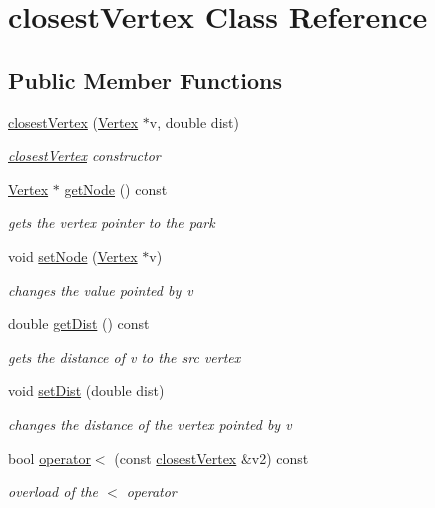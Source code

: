\hypertarget{classclosest_vertex}{}\section{closest\+Vertex Class Reference}
\label{classclosest_vertex}
\subsection*{Public Member Functions}
\begin{DoxyCompactItemize}
\item 
\hyperlink{classclosest_vertex_acd41491eb99e59a0f10ee8de0b50a66d}{closest\+Vertex} (\hyperlink{class_vertex}{Vertex} $\ast$v, double dist)
\begin{DoxyCompactList}\small\item\em \hyperlink{classclosest_vertex}{closest\+Vertex} constructor \end{DoxyCompactList}\item 
\hyperlink{class_vertex}{Vertex} $\ast$ \hyperlink{classclosest_vertex_ac5f6fae3c1b289755622166f2ef700c0}{get\+Node} () const
\begin{DoxyCompactList}\small\item\em gets the vertex pointer to the park \end{DoxyCompactList}\item 
void \hyperlink{classclosest_vertex_a899b2479d95304851a4749e008b21065}{set\+Node} (\hyperlink{class_vertex}{Vertex} $\ast$v)
\begin{DoxyCompactList}\small\item\em changes the value pointed by v \end{DoxyCompactList}\item 
double \hyperlink{classclosest_vertex_a2b8387796aa6b9dedaac682ee11ecc30}{get\+Dist} () const
\begin{DoxyCompactList}\small\item\em gets the distance of v to the src vertex \end{DoxyCompactList}\item 
void \hyperlink{classclosest_vertex_a16d20ede3c6e2be693305fac4e0ccdea}{set\+Dist} (double dist)
\begin{DoxyCompactList}\small\item\em changes the distance of the vertex pointed by v \end{DoxyCompactList}\item 
bool \hyperlink{classclosest_vertex_ac4d58777399d8d0fea2ab441cd00660e}{operator$<$} (const \hyperlink{classclosest_vertex}{closest\+Vertex} \&v2) const
\begin{DoxyCompactList}\small\item\em overload of the $<$ operator \end{DoxyCompactList}\end{DoxyCompactItemize}



